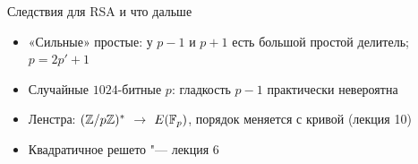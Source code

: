 \documentclass{ca-slides}
\begin{document}
\begin{canvasframe}{Следствия для RSA и что дальше}
  \small
  \begin{itemize}
    \item «Сильные» простые: у $p - 1$ и $p + 1$ есть большой простой делитель;
      $p = 2p' + 1$
    \item Случайные $1024$-битные $p$: гладкость $p - 1$ практически невероятна
    \item Ленстра: $(\mathbb{Z}/p\mathbb{Z})^{*}$ $\to$ $E(\mathbb{F}_p)$, порядок меняется с кривой (лекция 10)
    \item Квадратичное решето "--- лекция 6
  \end{itemize}
\end{canvasframe}
\end{document}

